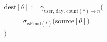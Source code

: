 \documentclass{article}
\newcommand{\source}[1]{\ensuremath{\text{source}\left[{#1}\right]}}
\newcommand{\dest}[1]{\ensuremath{\text{dest}\left[{#1}\right]}}
\newcommand{\isfinal}[1]{\ensuremath{\text{isFinal}\left({#1}\right)}}
\newcommand{\ind}{\ensuremath{\phantom{= =}}}
\begin{document}
\begin{center}
\begin{preview}
	\hspace*{-3.65cm}\vbox{
	\begin{align*}
		&\dest{\theta} := \gamma_{\text{user, day, count} (*) \rightarrow n} \bigl( \\
		&\ind \sigma_{\isfinal{*}}\bigl( \source{\theta} \bigr) \nonumber \\
		&\bigr) \nonumber\\
	\end{align*}
	}\hspace*{-3.65cm}
\end{preview}
\end{center}
\end{document}

